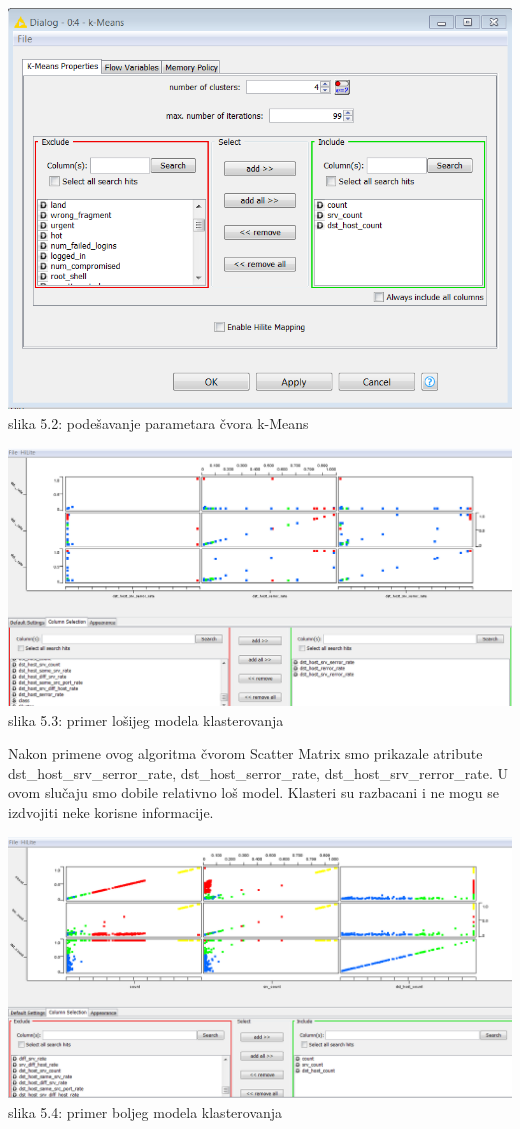 \documentclass[10pt]{article}
\begin{document}
\begin{center}
\includegraphics[width = \textwidth, height = 6.5 cm]{Klaster3}
slika 5.2: pode\v savanje parametara \v cvora k-Means\\
\end{center}

\begin{center}
\includegraphics[width = \textwidth]{Klaster4}
slika 5.3: primer lo\v sijeg modela klasterovanja\\
\end{center}

Nakon primene ovog algoritma \v cvorom Scatter Matrix smo prikazale atribute dst\_host\_srv\_serror\_rate, dst\_host\_serror\_rate, dst\_host\_srv\_rerror\_rate. U ovom slu\v caju smo dobile relativno lo\v s model. Klasteri su razbacani i ne mogu se izdvojiti neke korisne informacije.

\begin{center}
\includegraphics[width = \textwidth]{Klaster2}
slika 5.4: primer boljeg modela klasterovanja\\
\end{center}
\end{document}
